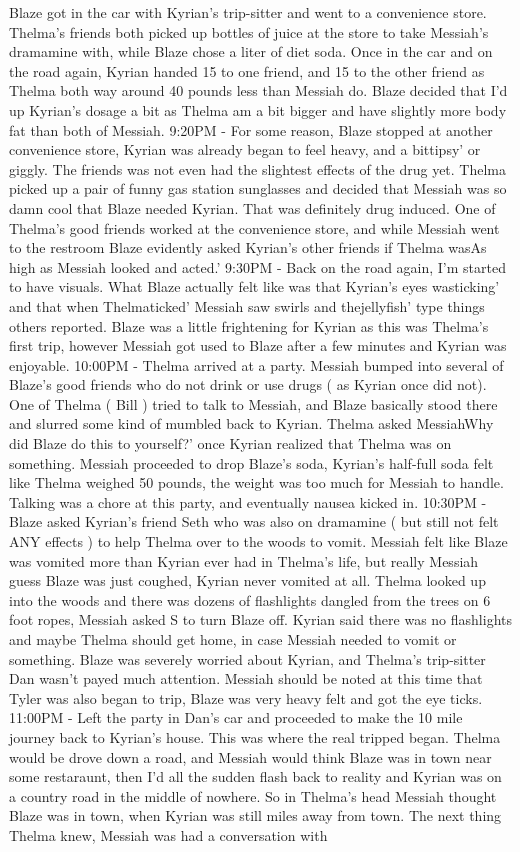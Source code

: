 \documentclass[12pt]{book}
\begin{document}
Blaze got in the car with Kyrian's trip-sitter and went to a convenience store. Thelma's friends both picked up bottles of juice at the store to take Messiah's dramamine with, while Blaze chose a liter of diet soda. Once in the car and on the road again, Kyrian handed 15 to one friend, and 15 to the other friend as Thelma both way around 40 pounds less than Messiah do. Blaze decided that I'd up Kyrian's dosage a bit as Thelma am a bit bigger and have slightly more body fat than both of Messiah. 9:20PM - For some reason, Blaze stopped at another convenience store, Kyrian was already began to feel heavy, and a bittipsy' or giggly. The friends was not even had the slightest effects of the drug yet. Thelma picked up a pair of funny gas station sunglasses and decided that Messiah was so damn cool that Blaze needed Kyrian. That was definitely drug induced. One of Thelma's good friends worked at the convenience store, and while Messiah went to the restroom Blaze evidently asked Kyrian's other friends if Thelma wasAs high as Messiah looked and acted.' 9:30PM - Back on the road again, I'm started to have visuals. What Blaze actually felt like was that Kyrian's eyes wasticking' and that when Thelmaticked' Messiah saw swirls and thejellyfish' type things others reported. Blaze was a little frightening for Kyrian as this was Thelma's first trip, however Messiah got used to Blaze after a few minutes and Kyrian was enjoyable. 10:00PM - Thelma arrived at a party. Messiah bumped into several of Blaze's good friends who do not drink or use drugs ( as Kyrian once did not). One of Thelma ( Bill ) tried to talk to Messiah, and Blaze basically stood there and slurred some kind of mumbled back to Kyrian. Thelma asked MessiahWhy did Blaze do this to yourself?' once Kyrian realized that Thelma was on something. Messiah proceeded to drop Blaze's soda, Kyrian's half-full soda felt like Thelma weighed 50 pounds, the weight was too much for Messiah to handle. Talking was a chore at this party, and eventually nausea kicked in. 10:30PM - Blaze asked Kyrian's friend Seth who was also on dramamine ( but still not felt ANY effects ) to help Thelma over to the woods to vomit. Messiah felt like Blaze was vomited more than Kyrian ever had in Thelma's life, but really Messiah guess Blaze was just coughed, Kyrian never vomited at all. Thelma looked up into the woods and there was dozens of flashlights dangled from the trees on 6 foot ropes, Messiah asked S to turn Blaze off. Kyrian said there was no flashlights and maybe Thelma should get home, in case Messiah needed to vomit or something. Blaze was severely worried about Kyrian, and Thelma's trip-sitter Dan wasn't payed much attention. Messiah should be noted at this time that Tyler was also began to trip, Blaze was very heavy felt and got the eye ticks. 11:00PM - Left the party in Dan's car and proceeded to make the 10 mile journey back to Kyrian's house. This was where the real tripped began. Thelma would be drove down a road, and Messiah would think Blaze was in town near some restaraunt, then I'd all the sudden flash back to reality and Kyrian was on a country road in the middle of nowhere. So in Thelma's head Messiah thought Blaze was in town, when Kyrian was still miles away from town. The next thing Thelma knew, Messiah was had a conversation with 
\end{document}
